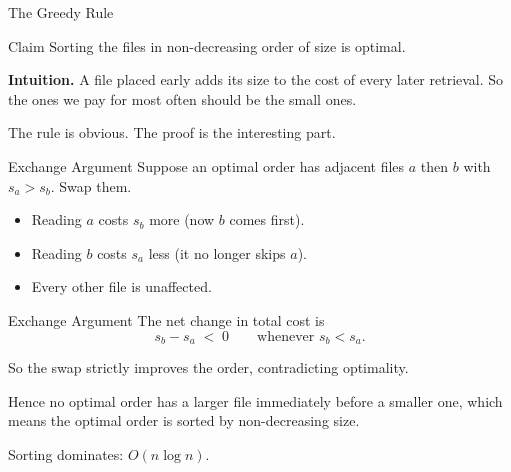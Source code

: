 \documentclass[10pt,aspectratio=169]{beamer}
\begin{document}
\begin{frame}{The Greedy Rule}
  \begin{block}{Claim}
    Sorting the files in \alert{non-decreasing order of size} is optimal.
  \end{block}

  \bigskip
  \textbf{Intuition.} A file placed early adds its size to the cost of every
  later retrieval. So the ones we pay for most often should be the
  \alert{small} ones.

  \bigskip
  \begin{center}
    The rule is obvious. The proof is the interesting part.
  \end{center}
\end{frame}

\begin{frame}{Exchange Argument}
  Suppose an optimal order has adjacent files $a$ then $b$ with
  $s_a > s_b$. Swap them.

  \bigskip
  \begin{center}
  \end{center}

  \pause
  \bigskip
  \begin{itemize}
    \item Reading $a$ costs $s_b$ \alert{more} (now $b$ comes first).
    \item Reading $b$ costs $s_a$ \alert{less} (it no longer skips $a$).
    \item Every other file is unaffected.
  \end{itemize}
\end{frame}

\begin{frame}{Exchange Argument}
  The net change in total cost is
  \[
    s_b - s_a \;<\; 0 \qquad \text{whenever } s_b < s_a .
  \]

  \bigskip
  So the swap \alert{strictly improves} the order, contradicting optimality.

  \bigskip
  Hence no optimal order has a larger file immediately before a smaller one,
  which means the optimal order is sorted by non-decreasing size.

  \bigskip
  \begin{alertblock}{}
    Sorting dominates: $O(n \log n)$.
  \end{alertblock}
\end{frame}
\end{document}

